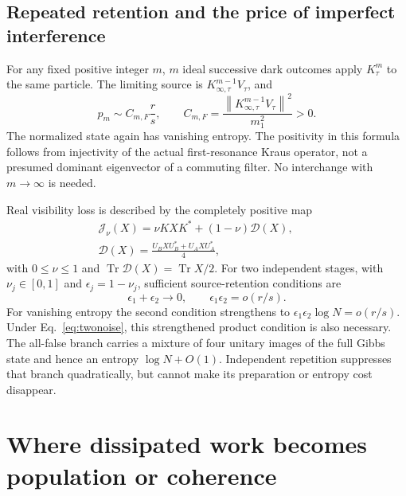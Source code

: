 \documentclass[aps,pra,reprint,superscriptaddress,longbibliography]{revtex4-2}
\newcommand{\Tr}{\operatorname{Tr}}
\newcommand{\norm}[1]{\left\lVert#1\right\rVert}
\begin{document}
\subsection{Repeated retention and the price of imperfect interference}

For any fixed positive integer $m$, $m$ ideal successive dark outcomes
apply $K_\tau^m$ to the same particle. The limiting source is
$K_{\infty,\tau}^{m-1}V_\tau$, and
\begin{equation}
 p_m\sim C_{m,F}\frac r s,\qquad
 C_{m,F}=\frac{\norm{K_{\infty,\tau}^{m-1}V_\tau}^2}{m_1^2}>0.
                                                               \label{eq:repeat}
\end{equation}
The normalized state again has vanishing entropy. The positivity in
this formula follows from injectivity of the actual first-resonance
Kraus operator, not a presumed dominant eigenvector of a commuting
filter. No interchange with $m\to\infty$ is needed.

Real visibility loss is described by the completely positive map
\begin{equation}
 \begin{gathered}
 \mathcal J_\nu(X)=\nu KXK^*+(1-\nu)\mathcal D(X),\qquad\\
 \mathcal D(X)=\frac{U_BXU_B^*+U_AXU_A^*}{4},                  \label{eq:visibility}
 \end{gathered}
\end{equation}
with $0\le\nu\le1$ and $\Tr\mathcal D(X)=\Tr X/2$.
For two independent stages, with $\nu_j\in[0,1]$ and
$\epsilon_j=1-\nu_j$, sufficient source-retention conditions are
\begin{equation}
 \epsilon_1+\epsilon_2\to0,\qquad
 \epsilon_1\epsilon_2=o(r/s).                                \label{eq:twonoise}
\end{equation}
For vanishing entropy the second condition strengthens to
$\epsilon_1\epsilon_2\log N=o(r/s)$. Under Eq.~\eqref{eq:twonoise},
this strengthened product condition is also necessary. The
all-false branch carries a mixture of four unitary images of the
full Gibbs state and hence an entropy $\log N+O(1)$. Independent
repetition suppresses that branch quadratically, but cannot make its
preparation or entropy cost disappear.

\section{Where dissipated work becomes population or coherence}
\label{sec:thermo}
\end{document}
